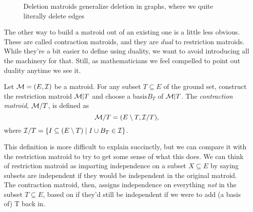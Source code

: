 \documentclass[12pt,oneside]{../../sfsuthesis}
\begin{document}
\begin{figure}[H]
\begin{subfigure}[t]{.45\textwidth}
    \end{subfigure}
    \caption{Deletion matroids generalize deletion in graphs, where we quite literally delete edges}\label{fig:contractionMatroid}
\end{figure}

The other way to build a matroid out of an existing one is a little less obvious.
These are called contraction matroids, and they are \emph{dual} to restriction matroids.
While they're a bit easier to define using duality, we want to avoid introducing all the machinery for that.
Still, as mathematicians we feel compelled to point out duality anytime we see it.

\begin{definition}\th\label{def:contractionMatroid}

    Let \( \mathcal{M} = (E, \mathcal{I}) \) be a matroid.
    For any subset \( T \subseteq E \) of the ground set, construct the restriction matroid \( \mathcal{M}|T \) and choose a basis\( B_T \) of \( \mathcal{M}|T \).
    The \emph{contraction matroid}, \( \mathcal{M}/T \), is defined as
    \[
        \mathcal{M}/T = ( E \setminus T, \mathcal{I}/T ),
    \]
    where \( \mathcal{I}/T = \{ I \subseteq (E \setminus T) \; | \; I \cup B_T \in \mathcal{I} \} \).
\end{definition}

This definition is more difficult to explain succinctly, but we can compare it with the restriction matroid to try to get some sense of what this does.
We can think of  restriction matroid as imparting independence on a subset \( X \subseteq E \) by saying subsets are independent if they would be independent in the original matroid.
The contraction matroid, then, assigns independence on everything \emph{not} in the subset \( T \subseteq E \),  based on if they'd still be independent if we were to add (a basis of) T back in.
\end{document}

